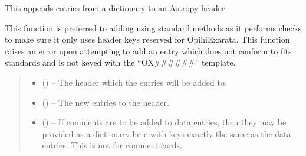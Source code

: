 \documentclass[letterpaper,11pt,english]{sphinxmanual}
\begin{document}

\begin{savenotes}\begin{fulllineitems}
\label{\detokenize{code/opihiexarata.library.fits:opihiexarata.library.fits.update_fits_header}}
\pysigstartsignatures
{}
\pysigstopsignatures
\sphinxAtStartPar
This appends entries from a dictionary to an Astropy header.

\sphinxAtStartPar
This function is preferred to adding using standard methods as it performs
checks to make sure it only uses header keys reserved for OpihiExarata.
This function raises an error upon attempting to add an entry which does
not conform to fits standards and is not keyed with the “OX\#\#\#\#\#\#”
template.
\begin{quote}\begin{description}
\begin{itemize}
\item {} 
\sphinxAtStartPar
{} () – The header which the entries will be added to.

\item {} 
\sphinxAtStartPar
{} () – The new entries to the header.

\item {} 
\sphinxAtStartPar
{} (\sphinxstyleliteralemphasis{\sphinxupquote{, }}) – If comments are to be added to data entries, then they may be
provided as a dictionary here with keys exactly the same as the
data entries. This is not for comment cards.

\end{itemize}

\end{description}\end{quote}

\end{fulllineitems}\end{savenotes}
\end{document}
